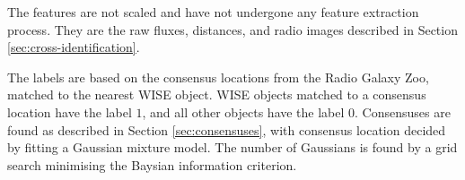 \documentclass[11pt]{book}
\begin{document}
  The features are not scaled and have not undergone any feature extraction
  process. They are the raw fluxes, distances, and radio images described in
  Section \ref{sec:cross-identification}.

  The labels are based on the consensus locations from the Radio Galaxy Zoo,
  matched to the nearest WISE object. WISE objects matched to a consensus
  location have the label $1$, and all other objects have the label $0$.
  Consensuses are found as described in Section \ref{sec:consensuses}, with
  consensus location decided by fitting a Gaussian mixture model. The number of
  Gaussians is found by a grid search minimising the Baysian information
  criterion.






\backmatter





\printindex
\end{document}
